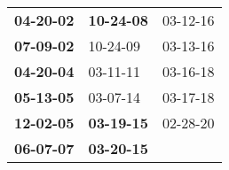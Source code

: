 \begin{supertabular}{p{0.33\columnwidth}p{0.33\columnwidth}p{0.33\columnwidth}}
 \textbf{04-20-02\textsuperscript{}} &  \textbf{10-24-08\textsuperscript{}} &  03-12-16\textsuperscript{} \\
 \textbf{07-09-02\textsuperscript{}} &           10-24-09\textsuperscript{} &  03-13-16\textsuperscript{} \\
 \textbf{04-20-04\textsuperscript{}} &           03-11-11\textsuperscript{} &  03-16-18\textsuperscript{} \\
 \textbf{05-13-05\textsuperscript{}} &           03-07-14\textsuperscript{} &  03-17-18\textsuperscript{} \\
 \textbf{12-02-05\textsuperscript{}} &  \textbf{03-19-15\textsuperscript{}} &  02-28-20\textsuperscript{} \\
 \textbf{06-07-07\textsuperscript{}} &  \textbf{03-20-15\textsuperscript{}} &                             \\
\end{supertabular}
